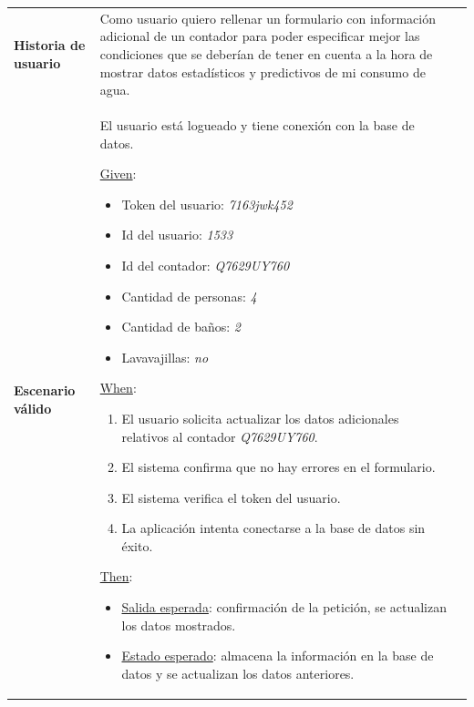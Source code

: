 \documentclass[pdftex,11pt,a4paper]{book}
\begin{document}
\begin{center}
\begin{longtable}{|>{\centering\arraybackslash}X m{2cm}|m{12cm}|}
\hline
\multicolumn{2}{|c|}{\textbf{Prueba de aceptación PA06}}\\
\hline 
\endhead

\textbf{Historia de usuario} & Como usuario quiero rellenar un formulario con información adicional de un contador para poder especificar mejor las condiciones que se deberían de tener en cuenta a la hora de mostrar datos estadísticos y predictivos de mi consumo de agua.

\\ \hline

\textbf{Escenario válido} & {\raggedright El usuario está logueado y tiene conexión con la base de datos.\par}
\vspace{2mm}
\break

\underline{Given}:
\begin{itemize}
\addtolength{\itemsep}{-3mm}
\item Token del usuario: \textit{7163jwk452}
\item Id del usuario: \textit{1533}
\item Id del contador: \textit{Q7629UY760}
\item Cantidad de personas: \textit{4}
\item Cantidad de baños: \textit{2}
\item Lavavajillas: \textit{no}

\end{itemize}
\vspace{3mm}

\underline{When}:
\begin{enumerate}
\vspace{-3mm}
\addtolength{\itemsep}{-3mm}
\item El usuario solicita actualizar los datos adicionales relativos al contador \textit{Q7629UY760}.
\item El sistema confirma que no hay errores en el formulario.
\item El sistema verifica el token del usuario.
\item La aplicación intenta conectarse a la base de datos sin éxito.

\end{enumerate}
\break

\underline{Then}:
\vspace{-3mm}
\begin{itemize}
\addtolength{\itemsep}{-3mm}
\item \underline{Salida esperada}: confirmación de la petición, se actualizan los datos mostrados.
\item \underline{Estado esperado}: almacena la información en la base de datos y se actualizan los datos anteriores.
\end{itemize}


\end{longtable}
\end{center}
\end{document}
